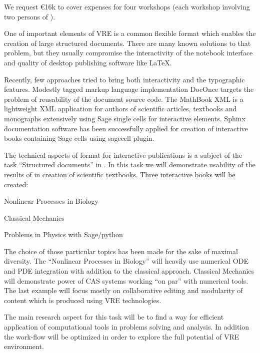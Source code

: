 \begin{workpackage}
\begin{tasklist}
\begin{task}[title=Workshops in developing countries]
We request \euro{16k} to cover expenses for four workshops (each workshop involving
two persons of \TheProject).

\end{task}

\begin{task}[title=Demonstrator: interactive books,
id=ibook,lead=US,PM=30]

One of important elements of VRE is a common flexible format which
enables the creation of large structured documents. There are many
known solutions to that problem, but they usually compromise the
interactivity of the notebook interface and quality of desktop
publishing software like LaTeX. 

Recently, few approaches tried to bring both interactivity and the
typographic features. Modestly tagged markup language implementation
DocOnce targets the problem of reusability of the document source
code. The MathBook XML is a lightweight XML application for authors of
scientific articles, textbooks and monographs extensively using Sage
single cells for interactive elements. Sphinx documentation software
has been successfully applied for creation of interactive books
containing Sage cells using sagecell plugin. 

The technical aspects of format for interactive publications is a
subject of the task ``Structured documents'' in
. In this task we will demonstrate usability
of the results of  in creation of scientific
textbooks. Three interactive books will be created:

\begin{compactitem}
\item Nonlinear Processes in Biology 
\item Classical Mechanics  
\item Problems  in Physics with Sage/python    
\end{compactitem}

The choice of those particular topics has been made for the sake of maximal diversity. The ``Nonlinear Processes in Biology'' will heavily use numerical ODE and PDE integration with addition to the classical approach. Classical Mechanics will demonstrate power of CAS systems working ``on par'' with numerical tools. The last example will focus mostly on collaborative editing and modularity of content which is produced using VRE technologies. 

The main research aspect for this task will be to find a way for efficient application of computational tools in problems solving and analysis. In addition the work-flow will be optimized in order to explore the full potential of VRE environment. 


\end{task}
\end{tasklist}
\end{workpackage}
